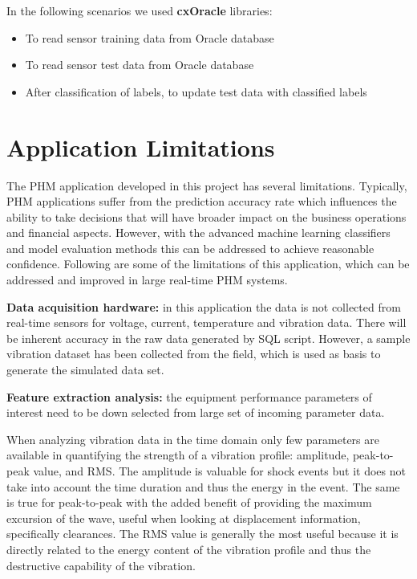 \documentclass[sigconf]{acmart}
\begin{document}
In the following scenarios we used \textbf{cxOracle} libraries:

\begin{itemize}
  \item To read sensor training data from Oracle database
  \item To read sensor test data from Oracle database
  \item After classification of labels, to update test data with classified labels
\end{itemize}

\section{Application Limitations}
The PHM application developed in this project has several limitations. Typically, PHM applications suffer from the prediction accuracy rate which influences the ability to take decisions that will have broader impact on the business operations and financial aspects. However, with the advanced machine learning classifiers and model evaluation methods this can be addressed to achieve reasonable confidence. Following are some of the limitations of this application, which can be addressed and improved in large real-time PHM systems.

\textbf{Data acquisition hardware:} in this application the data is not collected from real-time sensors for voltage, current, temperature and vibration data. There will be inherent accuracy in the raw data generated by SQL script. However, a sample vibration dataset has been collected from the field, which is used as basis to generate the simulated data set.

\textbf{Feature extraction analysis:} the equipment performance parameters of interest need to be down selected from large set of incoming parameter data. 


When analyzing vibration data in the time domain only few parameters are available in quantifying the strength of a vibration profile: amplitude, peak-to-peak value, and RMS.  
The amplitude is valuable for shock events but it does not take into account the time duration and thus the energy in the event. The same is true for peak-to-peak with the added benefit of providing the maximum excursion of the wave, useful when looking at displacement information, specifically clearances. The RMS value is generally the most useful because it is directly related to the energy content of the vibration profile and thus the destructive capability of the vibration.
\end{document}
